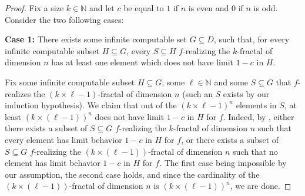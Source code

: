 \documentclass{article}
\numberwithin{theorem}{section}
\newcommand{\quentin}[1]{\textcolor{green}{#1}}
\newcommand{\uh}{\upharpoonright}
\newcommand{\NN}[0]{\mathbb{N}}
\begin{document}
\begin{proof}
Fix a size $k \in \NN$ and let $c$ be equal to $1$ if $n$ is even and $0$ if $n$ is odd. Consider the two following cases:
\smallskip


\textbf{Case 1:} There exists some infinite computable set $G \subseteq D$, such that, for every infinite computable subset $H \subseteq G$, every $S \subseteq H$ $f$-realizing the $k$-fractal of dimension $n$ has at least one element which does not have limit $1-c$ in $H$. 

 

Fix some infinite computable subset $H \subseteq G$, some $\ell \in \NN$ and some $S \subseteq G$ that $f$-realizes the $(k\times \ell - 1)$-fractal of dimension $n$ (such an $S$ exists by our induction hypothesis). We claim that out of the $(k \times \ell - 1)^n$ elements in $S$, at least $(k \times (\ell - 1))^n$ does not have limit $1 - c$ in $H$ for $f$. Indeed, by , either there exists a subset of $S \subseteq G$ $f$-realizing the $k$-fractal of dimension $n$ such that every element has limit behavior $1 - c$ in $H$ for $f$, or there exists a subset of $S \subseteq G$ $f$-realizing the $(k \times (\ell - 1))$-fractal of dimension $n$ such that no element has limit behavior $1 - c$ in $H$ for $f$. The first case being impossible by our assumption, the second case holds, and since the cardinality of the $(k \times (\ell - 1))$-fractal of dimension $n$ is $(k\times (\ell - 1))^n$, we are done.


\end{proof}
\end{document}
